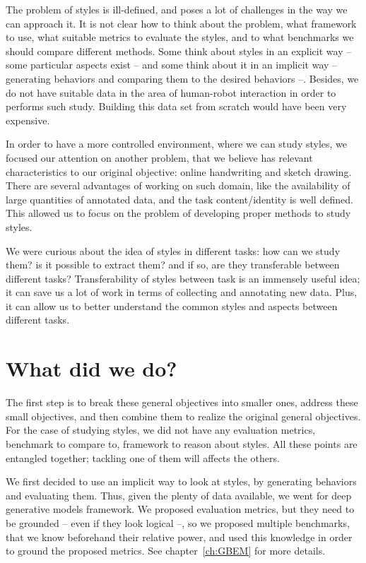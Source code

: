  \par The problem of styles is ill-defined, and poses a lot of challenges in the way we can approach it. It is not clear how to think about the problem, what framework to use, what suitable metrics to evaluate the styles, and to what benchmarks we should compare different methods. Some think about styles in an explicit way -- some particular aspects exist -- and some think about it in an implicit way -- generating behaviors and comparing them to the desired behaviors --. Besides, we do not have suitable data in the area of human-robot interaction in order to performs such study. Building this data set from scratch would have been very expensive.

  \par In order to have a more controlled environment, where we can study styles, we focused our attention on another problem, that we believe has relevant characteristics to our original objective: online handwriting and sketch drawing. There are several advantages of working on such domain, like the availability of large quantities of annotated data, and the task content/identity is well defined. This allowed us to focus on the problem of developing proper methods to study styles.

  \par We were curious about the idea of styles in different tasks: how can we study them? is it possible to extract them? and if so, are they transferable between different tasks? Transferability of styles between task is an immensely useful idea; it can save us a lot of work in terms of collecting and annotating new data. Plus, it can allow us to better understand the common styles and aspects between different tasks.

\section{What did we do?}

  \par The first step is to break these general objectives into smaller ones, address these small objectives, and then combine them to realize the original general objectives. For the case of studying styles, we did not have any evaluation metrics, benchmark to compare to, framework to reason about styles. All these points are entangled together; tackling one of them will affects the others.

  \par We first decided to use an implicit way to look at styles, by generating behaviors and evaluating them. Thus, given the plenty of data available, we went for deep generative models framework. We proposed evaluation metrics, but they need to be grounded -- even if they look logical --, so we proposed multiple benchmarks, that we know beforehand their relative power, and used this knowledge in order to ground the proposed metrics. See chapter~\ref{ch:GBEM} for more details.

